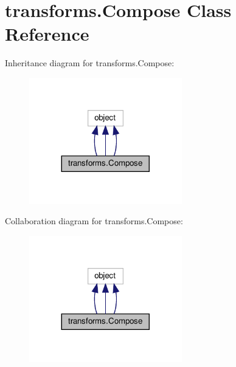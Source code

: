 \hypertarget{classtransforms_1_1Compose}{}\section{transforms.\+Compose Class Reference}
\label{classtransforms_1_1Compose}


Inheritance diagram for transforms.\+Compose\+:
\nopagebreak
\begin{figure}[H]
\begin{center}
\leavevmode
\includegraphics[width=188pt]{classtransforms_1_1Compose__inherit__graph}
\end{center}
\end{figure}


Collaboration diagram for transforms.\+Compose\+:
\nopagebreak
\begin{figure}[H]
\begin{center}
\leavevmode
\includegraphics[width=188pt]{classtransforms_1_1Compose__coll__graph}
\end{center}
\end{figure}
